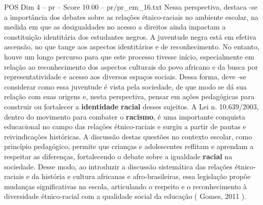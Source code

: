 \begin{textsample}{POS Dim 4 – pr – Score 10.00 – pr/pr\_em\_16.txt}
Nessa perspectiva, destaca -se a importância dos debates sobre as relações étnico-raciais no ambiente escolar, na medida em que as desigualdades no acesso a direitos ainda impactam a constituição identitária dos estudantes negros.
A juventude negra está em efetiva ascensão, no que tange aos aspectos identitários e de reconhecimento.
No entanto, houve um longo percurso para que este processo tivesse início, especialmente em relação ao reconhecimento dos aspectos culturais do povo africano e da busca por representatividade e acesso aos diversos espaços sociais.
Dessa forma, deve -se considerar como essa juventude é vista pela sociedade, de que modo se dá sua relação com suas origens e, nesta perspectiva, pensar em ações pedagógicas para construir ou fortalecer a \textbf{identidade} \textbf{racial} desses sujeitos.
A Lei n. 10.639/2003, dentro do movimento para combater o \textbf{racismo}, é uma importante conquista educacional no campo das relações étnico-raciais e surgiu a partir de pautas e reivindicações históricas.
A discussão destas questões no contexto escolar, como princípio pedagógico, permite que crianças e adolescentes reflitam e aprendam a respeitar as diferenças, fortalecendo o debate sobre a igualdade \textbf{racial} na sociedade.
Desse modo, ao introduzir a discussão sistemática das relações étnico-raciais e da história e cultura africanas e afro-brasileiras, essa legislação propõe mudanças significativas na escola, articulando o respeito e o reconhecimento à diversidade étnico-racial com a qualidade social da educação ( Gomes, 2011 ).

\end{textsample}
